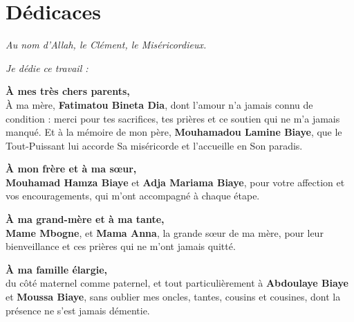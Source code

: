 
\chapter*{Dédicaces}
{}

\vspace{0.35cm}

\textit{Au nom d'Allah, le Clément, le Miséricordieux.}

\vspace{0.30cm}

\textit{Je dédie ce travail :}

\vspace{0.30cm}

\noindent\textbf{À mes très chers parents,}\\
À ma mère, \textbf{Fatimatou Bineta Dia}, dont l'amour n'a jamais connu de
condition : merci pour tes sacrifices, tes prières et ce soutien qui ne m'a
jamais manqué. Et à la mémoire de mon père, \textbf{Mouhamadou Lamine Biaye},
que le Tout-Puissant lui accorde Sa miséricorde et l'accueille en Son
paradis.

\vspace{0.16cm}

\noindent\textbf{À mon frère et à ma sœur,}\\
\textbf{Mouhamad Hamza Biaye} et \textbf{Adja Mariama Biaye}, pour votre
affection et vos encouragements, qui m'ont accompagné à chaque étape.

\vspace{0.16cm}

\noindent\textbf{À ma grand-mère et à ma tante,}\\
\textbf{Mame Mbogne}, et \textbf{Mama Anna}, la grande sœur de ma mère, pour
leur bienveillance et ces prières qui ne m'ont jamais quitté.

\vspace{0.16cm}

\noindent\textbf{À ma famille élargie,}\\
du côté maternel comme paternel, et tout particulièrement à
\textbf{Abdoulaye Biaye} et \textbf{Moussa Biaye}, sans oublier mes oncles,
tantes, cousins et cousines, dont la présence ne s'est jamais démentie.

\vspace{0.16cm}

